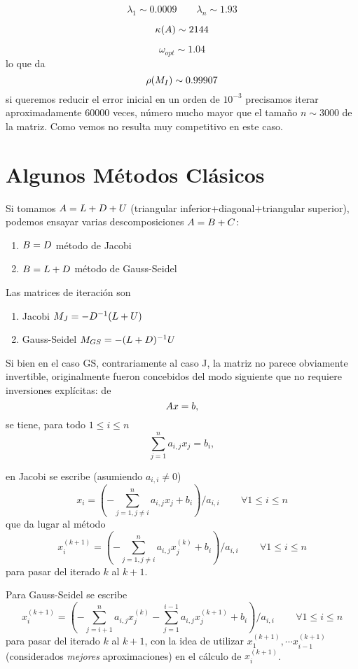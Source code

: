 $$
\lambda_1\sim 0.0009 \qquad \lambda_n \sim 1.93
$$

$$\kappa(\Ab)\sim 2144$$

$$\omega_{opt}\sim
1.04$$
lo que da
$$\rho(\Mb_I)\sim 0.99907$$
si queremos reducir  el error inicial en un orden  de $10^{-3}$ precisamos iterar aproximadamente $60000$ veces, número mucho mayor que el tamaño  $n\sim 3000$ de la matriz. Como vemos no resulta muy competitivo en este caso. 
\etcc


\section{Algunos Métodos Clásicos}



Si tomamos $\Ab=\Lb+\Db+\Ub$ (triangular inferior+diagonal+triangular superior), podemos ensayar varias descomposiciones $\Ab=\Bb+\Cb$:
\begin{enumerate}
 \item $\Bb=\Db$ método de Jacobi
 \item $\Bb=\Lb+\Db$ método de Gauss-Seidel
\end{enumerate}

Las matrices de iteración son
\begin{enumerate}
 \item Jacobi $\Mb_J=-\Db^{-1}(\Lb+\Ub)$
 \item Gauss-Seidel $\Mb_{GS}=-(\Lb+\Db)^{-1}\Ub$
\end{enumerate}

Si bien en el caso GS, contrariamente al  caso J, la matriz no parece obviamente invertible, originalmente fueron concebidos del  modo siguiente que no requiere inversiones explícitas:
de
$$
\Ab\xb=\bb,
$$
se tiene, para todo $1\le i\le n$
$$
\sum_{j=1}^na_{i,j}x_j=b_i,
$$

en Jacobi se escribe (asumiendo $a_{i,i}\neq0$)
$$
x_i=\left(-\sum_{j=1,j\neq i}^na_{i,j}x_j+b_i\right)/a_{i,i}\, \qquad \forall 1\le i\le n
$$
que da lugar al método
$$
x_i^{(k+1)}=\left(-\sum_{j=1,j\neq i}^na_{i,j}x_j^{(k)}+b_i\right)/a_{i,i}\, \qquad \forall 1\le i\le n
$$
para pasar del iterado $k$ al $k+1$.



Para Gauss-Seidel se escribe
$$
x_i^{(k+1)}=\left(-\sum_{j=i+1}^na_{i,j}x_j^{(k
)}-\sum_{j=1}^{i-1}a_{i,j}x_j^{(k+1)}+b_i\right)/a_{i,i}\, \qquad \forall 1\le i\le n
$$
para pasar del iterado $k$ al $k+1$, con la idea de  utilizar
$x_1^{(k+1)},\cdots x_{i-1}^{(k+1)}$ (considerados \emph{mejores} aproximaciones) en el cálculo de $x_i^{(k+1)}$.

